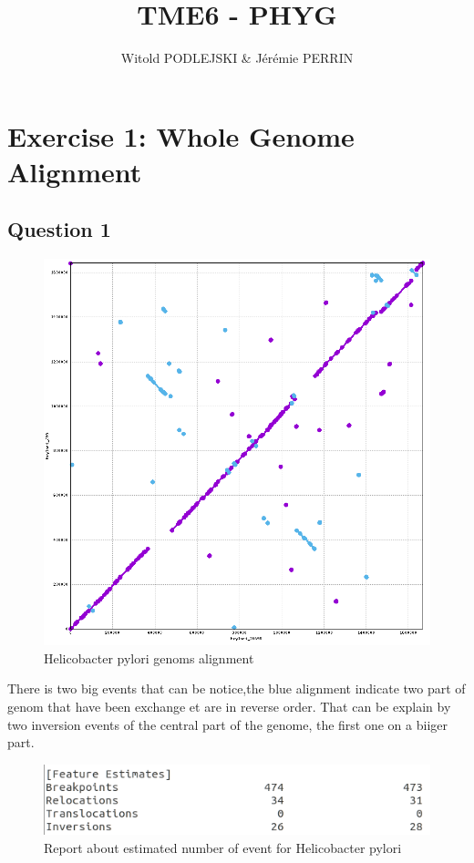 \documentclass[]{article}
\title{TME6 - PHYG}
\author{Witold PODLEJSKI \& Jérémie PERRIN}
\theoremstyle{definition}
\begin{document}
\maketitle

\section{Exercise 1: Whole Genome Alignment}

\subsection{Question 1}

\begin{figure}[H]
	\centering
	\includegraphics*[scale=0.4]{image/Hpylori.png}
	\caption{ Helicobacter pylori genoms alignment }
\end{figure}

There is two big events that can be notice,the blue alignment indicate two part of genom that have been exchange et are in reverse order. That can be explain by two inversion events of the central part of the genome, the first one on a biiger part.

\begin{figure}[H]
	\centering
	\includegraphics*[scale=0.7]{image/reportq1.png}
	\caption{ Report about estimated number of event for Helicobacter pylori }
\end{figure}
\end{document}
